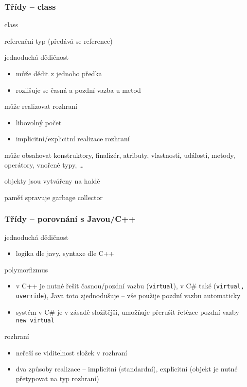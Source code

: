 
\begin{frame}[fragile]
\frametitle{Třídy -- class}
\begin{bitemize}{class}
\item referenční typ (předává se reference)
\item jednoduchá dědičnost
\begin{itemize}
\item může dědit z jednoho předka
\item rozlišuje se časná a pozdní vazba u metod
\end{itemize}
\item může realizovat rozhraní
\begin{itemize}
\item libovolný počet
\item implicitní/explicitní realizace rozhraní
\end{itemize}
\item může obsahovat konstruktory, finalizér, atributy, vlastnosti, události, metody, operátory, vnořené typy, \ldots
\item objekty jsou vytvářeny na haldě
\item paměť spravuje garbage collector
\end{bitemize}
\end{frame}



\begin{frame}[fragile]
\frametitle{Třídy -- porovnání s Javou/C++}
\begin{bitemize}{}
\item jednoduchá dědičnost
\begin{itemize}
\item logika dle javy, syntaxe dle C++
\end{itemize}
\item polymorfizmus
\begin{itemize}
\item v C++ je nutné řešit časnou/pozdní vazbu (\lstinline|virtual|), v C\# také (\lstinline|virtual, override|), Java toto zjednodušuje -- vše použije pozdní vazbu automaticky
\item systém v C\# je v zásadě složitější, umožňuje přerušit řetězec pozdní vazby \lstinline|new virtual|
\end{itemize}
\item rozhraní
\begin{itemize}
\item neřeší se viditelnost složek v rozhraní
\item dva způsoby realizace -- implicitní (standardní), explicitní (objekt je nutné přetypovat na typ rozhraní)
\end{itemize}
\end{bitemize}
\end{frame}



